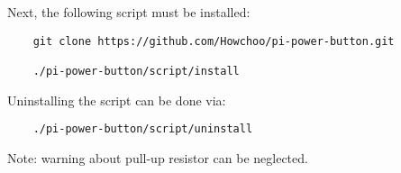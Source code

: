 Next, the following script must be installed:

\begin{verbatim}
	git clone https://github.com/Howchoo/pi-power-button.git
	
	./pi-power-button/script/install
\end{verbatim}

Uninstalling the script can be done via:

\begin{verbatim}
	./pi-power-button/script/uninstall
\end{verbatim}

Note: warning about pull-up resistor can be neglected.
